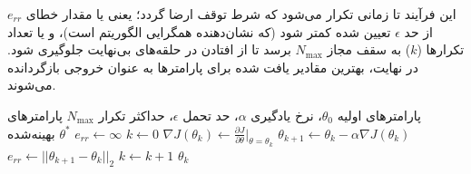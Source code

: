 این فرآیند تا زمانی تکرار می‌شود که شرط توقف ارضا گردد؛ یعنی یا مقدار خطای $e_{rr}$ از حد $\epsilon$ تعیین شده کمتر شود (که نشان‌دهنده همگرایی الگوریتم است)، و یا تعداد تکرارها ($k$) به سقف مجاز $N_{\max}$ برسد تا از افتادن در حلقه‌های بی‌نهایت جلوگیری شود. در نهایت، بهترین مقادیر یافت شده برای پارامتر‌ها به عنوان خروجی بازگردانده می‌شوند.






\begin{algorithm}[H]
	\caption{الگوریتم گرادیان کاهشی}
	\label{alg1}
	\begin{algorithmic}[1]
		\Require پارامترهای اولیه $\theta_0$، نرخ یادگیری $\alpha$، حد تحمل $\epsilon$، حداکثر تکرار $N_{\max}$
		\Ensure پارامترهای بهینه‌شده $\theta^*$
		\State $ e_{rr} \gets \infty $
		\State $ k \gets 0 $
		\State $ \nabla J(\theta_k) \gets \frac{\partial J}{\partial \theta}\big|_{\theta=\theta_k} $
		\State $ \theta_{k+1} \gets \theta_k - \alpha \nabla J(\theta_k) $
		\State $ e_{rr} \gets ||\theta_{k+1} - \theta_k||_2 $
		\State $ k \gets k + 1 $
		\EndWhile
		\State \Return $\theta_k$
	\end{algorithmic}
\end{algorithm}

\vspace{3cm}
